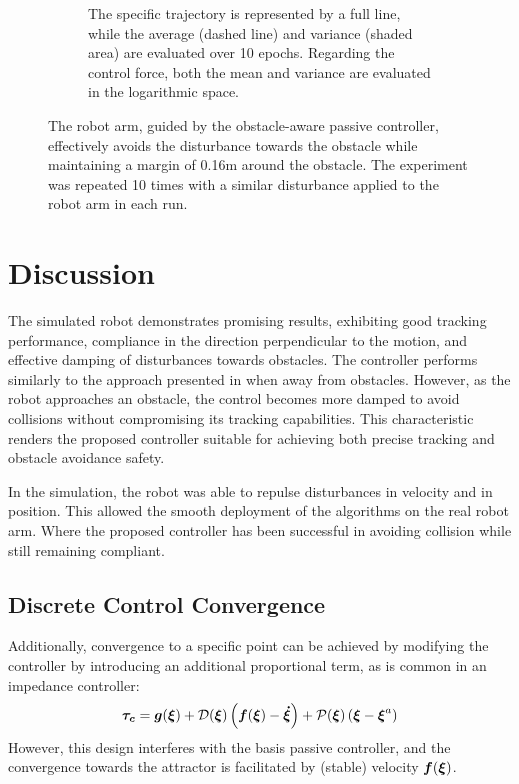 \begin{figure}
\begin{subfigure}{\columnwidth}
      \caption{The specific trajectory is represented by a full line, while the average (dashed line) and variance (shaded area) are evaluated over 10 epochs.  Regarding the control force, both the mean and variance are evaluated in the logarithmic space.}
      \label{fig:trajectory_comparison_force_and_distance}
    \end{subfigure}
	\caption{
The robot arm, guided by the obstacle-aware passive controller, effectively avoids the disturbance towards the obstacle while maintaining a margin of 0.16m around the obstacle. The experiment was repeated 10 times with a similar disturbance applied to the robot arm in each run.
 }  
    \label{fig:evaluation_on_robot_arm}
\end{figure}

\section{Discussion}
The simulated robot demonstrates promising results, exhibiting good tracking performance, compliance in the direction perpendicular to the motion, and effective damping of disturbances towards obstacles. The controller performs similarly to the approach presented in \cite{kronander2015passive} when away from obstacles. However, as the robot approaches an obstacle, the control becomes more damped to avoid collisions without compromising its tracking capabilities. This characteristic renders the proposed controller suitable for achieving both precise tracking and obstacle avoidance safety.

In the simulation, the robot was able to repulse disturbances in velocity and in position. This allowed the smooth deployment of the algorithms on the real robot arm. Where the proposed controller has been successful in avoiding collision while still remaining compliant.

\subsection{Discrete Control Convergence}
Additionally, convergence to a specific point can be achieved by modifying the controller by introducing an additional proportional term, as is common in an impedance controller:
\begin{equation}
	\vecs{\tau_c} = \vect g (\vecs\xi) 
	+ \matd{D}(\vecs\xi) \left(\vecs f(\vecs\xi) - \vecs{\dot\xi} \right) 
	+ \matd{P}(\vecs \xi) \left(\vecs \xi - \vecs \xi^a \right)
\label{eq:control_command_proportional}
\end{equation}
However, this design interferes with the basis passive controller, and the convergence towards the attractor is facilitated by (stable) velocity $\boldsymbol{f}(\boldsymbol{\xi})$. 


